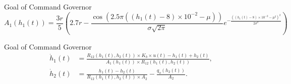\begin{slide}{Goal of Command Governor}
  \vspace*{\fill}
  \begin{equation}
    \label{eq:t1-area}
    A_{1}(h_{1}(t)) = \frac{3r}{5} \left(
    2.7r - \frac{\cos(2.5\pi{}((h_{1}(t)-8)\times{}10^{-2}-\mu))}{\sigma{}\sqrt{2\pi}}
    e^{-\frac{((h_{1}(t)-8)\times{}10^{-2}-\mu^{2})^{2}}{2\sigma^{2}}}
    \right)
  \end{equation}
  \vspace*{\fill}
\end{slide}

\begin{slide}{Goal of Command Governor}
  \vspace*{\fill}
  \begin{equation}
    \label{eq:formula-height-variation}
    \begin{aligned}
      \dot{h}_1(t) & = \frac{R_{12}(h_{1}(t),h_{2}(t))\times{}K_{b}\times{}u(t)-h_{1}(t)+h_{2}(t)}
      {A_{1}(h_{1}(t))\times{}R_{12}(h_{1}(t),h_{2}(t))},                                                                \\
      \dot{h}_2(t) & = \frac{h_{1}(t)-h_{2}(t)}{R_{12}(h_{1}(t),h_{2}(t))\times{}A_{2}} - \frac{q_{o}(h_{2}(t))}{A_{2}}.
    \end{aligned}
  \end{equation}
  \vspace*{\fill}
\end{slide}

